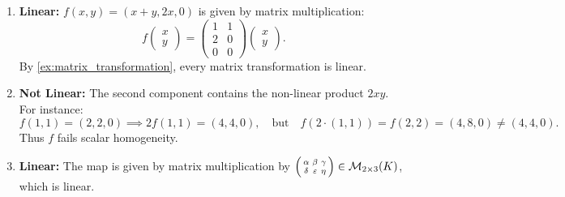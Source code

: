 \begin{exercisesolution*}
\label{sol:identifying_linear_maps_mc}
\begin{enumerate}[label=\textbf{(\arabic*)}]
    \item \textbf{Linear:} $f(x, y) = (x + y, 2x, 0)$ is given by matrix multiplication:
    \[
    f\begin{pmatrix} x \\ y \end{pmatrix} = \begin{pmatrix} 1 & 1 \\ 2 & 0 \\ 0 & 0 \end{pmatrix} \begin{pmatrix} x \\ y \end{pmatrix}.
    \]
    By \cref{ex:matrix_transformation}, every matrix transformation is linear.

    \item \textbf{Not Linear:} The second component contains the non-linear product $2xy$. For instance:
    \[
    f(1, 1) = (2, 2, 0) \implies 2 f(1, 1) = (4, 4, 0), \quad\text{but}\quad f(2 \cdot (1, 1)) = f(2, 2) = (4, 8, 0) \ne (4, 4, 0).
    \]
    Thus $f$ fails scalar homogeneity.

    \item \textbf{Linear:} The map is given by matrix multiplication by $\left(\begin{smallmatrix} \alpha & \beta & \gamma \\ \delta & \varepsilon & \eta \end{smallmatrix}\right) \in \mathcal{M}_{2 \times 3}(K)$, which is linear.
\end{enumerate}
\end{exercisesolution*}

